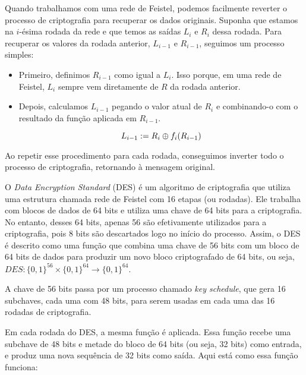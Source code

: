 Quando trabalhamos com uma rede de Feistel, podemos facilmente reverter o processo de criptografia para recuperar os dados originais.
Suponha que estamos na $i$-ésima rodada da rede e que temos as saídas $L_i$ e $R_i$ dessa rodada.
Para recuperar os valores da rodada anterior, $L_{i-1}$ e $R_{i-1}$, seguimos um processo simples:

\begin{itemize}
\item Primeiro, definimos $R_{i-1}$ como igual a $L_i$.
  Isso porque, em uma rede de Feistel, $L_i$ sempre vem diretamente de $R$ da rodada anterior.
\item Depois, calculamos $L_{i-1}$ pegando o valor atual de $R_i$ e combinando-o com o resultado da função aplicada em $R_{i-1}$.

  \begin{displaymath}
    L_{i-1} := R_i \oplus f_i(R_{i-1})
  \end{displaymath}
\end{itemize}

Ao repetir esse procedimento para cada rodada, conseguimos inverter todo o processo de criptografia, retornando à mensagem original.

O \textit{Data Encryption Standard} (DES) é um algoritmo de criptografia que utiliza uma estrutura chamada rede de Feistel com 16 etapas (ou rodadas).
Ele trabalha com blocos de dados de 64 bits e utiliza uma chave de 64 bits para a criptografia.
No entanto, desses 64 bits, apenas 56 são efetivamente utilizados para a criptografia, pois 8 bits são descartados logo no início do processo.
Assim, o DES é descrito como uma função que combina uma chave de 56 bits com um bloco de 64 bits de dados para produzir um novo bloco criptografado de 64 bits, ou seja, $DES: \{0,1\}^{56} \times \{0,1\}^{64} \to \{0,1\}^{64}$.

A chave de 56 bits passa por um processo chamado \textit{key schedule}, que gera 16 subchaves, cada uma com 48 bits, para serem usadas em cada uma das 16 rodadas de criptografia.

Em cada rodada do DES, a mesma função é aplicada.
Essa função recebe uma subchave de 48 bits e metade do bloco de 64 bits (ou seja, 32 bits) como entrada, e produz uma nova sequência de 32 bits como saída.
Aqui está como essa função funciona:

